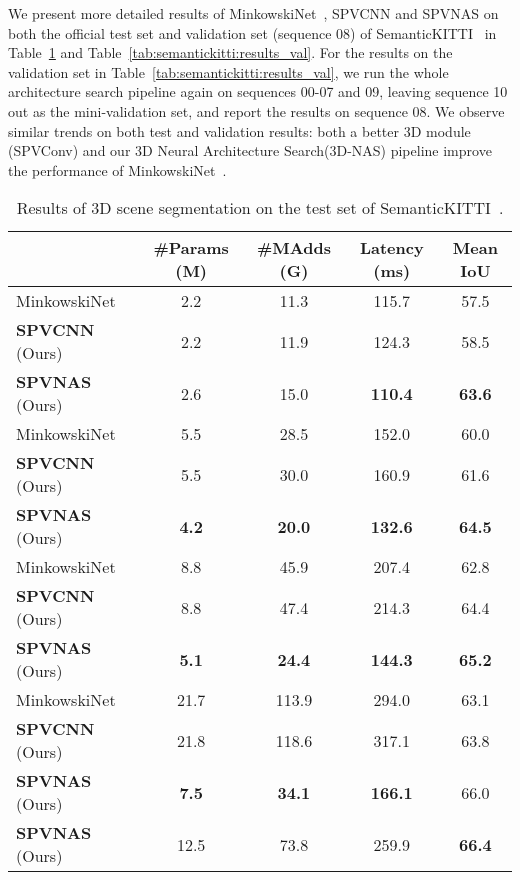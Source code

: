\documentclass[runningheads]{llncs}
\newcommand{\tab}[1]{Table~\ref{#1}}
\def\moduleshort{SPVConv\xspace}
\def\cnnshort{SPVCNN\xspace}
\def\modelshort{SPVNAS\xspace}
\def\nas{3D Neural Architecture Search\xspace}
\def\nasshort{3D-NAS\xspace}
\begin{document}
We present more detailed results of MinkowskiNet~\cite{choy20194d}, \cnnshort and \modelshort on both the official test set and validation set (sequence 08) of SemanticKITTI~\cite{behley2019semantickitti} in \tab{tab:semantickitti:results_test} and \tab{tab:semantickitti:results_val}. For the results on the validation set in \tab{tab:semantickitti:results_val}, we run the whole architecture search pipeline again on sequences 00-07 and 09, leaving sequence 10 out as the mini-validation set, and report the results on sequence 08. We observe similar trends on both test and validation results: both a better 3D module (\moduleshort) and our \nas (\nasshort) pipeline improve the performance of MinkowskiNet~\cite{choy20194d}. 

\begin{table}[t]
\setlength{\tabcolsep}{7pt}
\small\centering
\begin{tabular}{lcccc}
    \toprule
     & \#Params (M) & \#MAdds (G) & Latency (ms) & Mean IoU \\
    \midrule
    MinkowskiNet~\cite{choy20194d} & 2.2 & 11.3 & 115.7 & 57.5 \\
    \textbf{\cnnshort} (Ours) & 2.2 & 11.9 & 124.3 & 58.5 \\
    \textbf{\modelshort} (Ours) & 2.6 & 15.0 & \textbf{110.4} & \textbf{63.6} \\ \midrule
    
    MinkowskiNet~\cite{choy20194d} & 5.5 & 28.5 & 152.0 & 60.0 \\
    \textbf{\cnnshort} (Ours) & 5.5 & 30.0 & 160.9 & 61.6 \\
    \textbf{\modelshort} (Ours) & \textbf{4.2} & \textbf{20.0} & \textbf{132.6} & \textbf{64.5} \\ \midrule
    MinkowskiNet~\cite{choy20194d} & 8.8 & 45.9 & 207.4 & 62.8 \\
    \textbf{\cnnshort} (Ours) & 8.8 & 47.4 & 214.3 & 64.4 \\
    \textbf{\modelshort} (Ours) & \textbf{5.1} & \textbf{24.4} & \textbf{144.3} & \textbf{65.2} \\ \midrule
    MinkowskiNet~\cite{choy20194d} & 21.7 & 113.9 & 294.0 & 63.1 \\
    \textbf{\cnnshort} (Ours) & 21.8 & 118.6 & 317.1 & 63.8 \\
    \textbf{\modelshort} (Ours) & \textbf{7.5} & \textbf{34.1} & \textbf{166.1} & 66.0 \\ 
    \textbf{\modelshort} (Ours) & 12.5 & 73.8 & 259.9 & \textbf{66.4} \\ 
    \bottomrule
\end{tabular}
\caption{Results of 3D scene segmentation on the test set of SemanticKITTI~\cite{behley2019semantickitti}.}
\label{tab:semantickitti:results_test}
\end{table}
\end{document}
